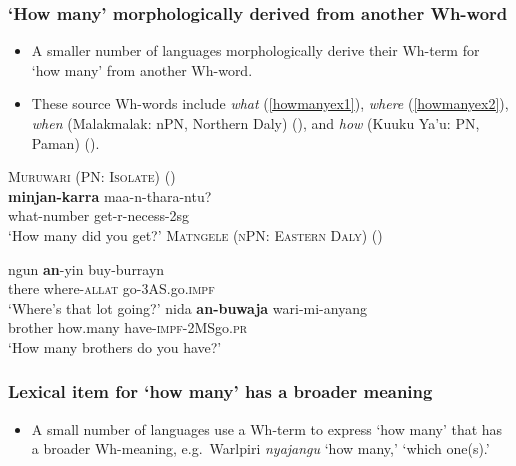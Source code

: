 \documentclass{article}
\begin{document}
\subsubsection{`How many' morphologically derived from another Wh-word}

\begin{itemize}
    \item A smaller number of languages morphologically derive their Wh-term for `how many' from another Wh-word.
    \item These source Wh-words include \textit{what} (\ref{howmanyex1}), \textit{where} (\ref{howmanyex2}), \textit{when} (Malakmalak: nPN, Northern Daly) (\citealt[17]{tryon74}), and \textit{how} (Kuuku Ya'u: PN, Paman) (\citealt[91]{thompson88}).
\end{itemize}

\begin{exe}
  \ex \label{howmanyex1} \textsc{Muruwari (PN: Isolate)} (\citealt[122]{oates88})\\
  \gll \textbf{minjan-karra} maa-n-thara-ntu?\\
  what-number get-{\sc r-necess-2sg}\\
  \glt `How many did you get?' %
  \ex \label{howmanyex2} \textsc{Matngele (nPN: Eastern Daly)} (\citealt[51]{zandvoort99})
  \begin{xlist}
    \ex \gll ngun \textbf{an}-yin buy-burrayn\\
    there where-\textsc{allat} go-3AS.go.\textsc{impf}\\
    \glt `Where's that lot going?' %
    \ex \gll nida \textbf{an-buwaja} wari-mi-anyang\\
    brother how.many have-\textsc{impf}-2MSgo.\textsc{pr}\\
    \glt `How many brothers do you have?' %
  \end{xlist}
\end{exe}

\subsubsection{Lexical item for `how many' has a broader meaning}

\begin{itemize}
    \item A small number of languages use a Wh-term to express `how many' that has a broader Wh-meaning, e.g.\ Warlpiri \textit{nyajangu} `how many,' `which one(s).'
\end{itemize}
\end{document}
